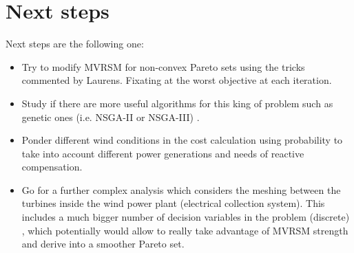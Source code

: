 \documentclass{article}
\begin{document}
\section{Next steps
}
Next steps are the following one:
\begin{itemize}
  \item Try to modify MVRSM for non-convex Pareto sets using the tricks commented by Laurens. Fixating at the worst objective at each iteration.
  \item Study if there are more useful algorithms for this king of problem such as genetic ones (i.e. NSGA-II or NSGA-III) .
  \item Ponder different wind conditions in the cost calculation using probability to take into account different power generations and needs of reactive compensation.
  \item Go for a further complex analysis which considers the meshing between the turbines inside the wind power plant (electrical collection system). This includes a much bigger number of decision variables in the problem (discrete) , which potentially would allow to really take advantage of MVRSM strength and derive into a smoother Pareto set.
\end{itemize}
\end{document}
